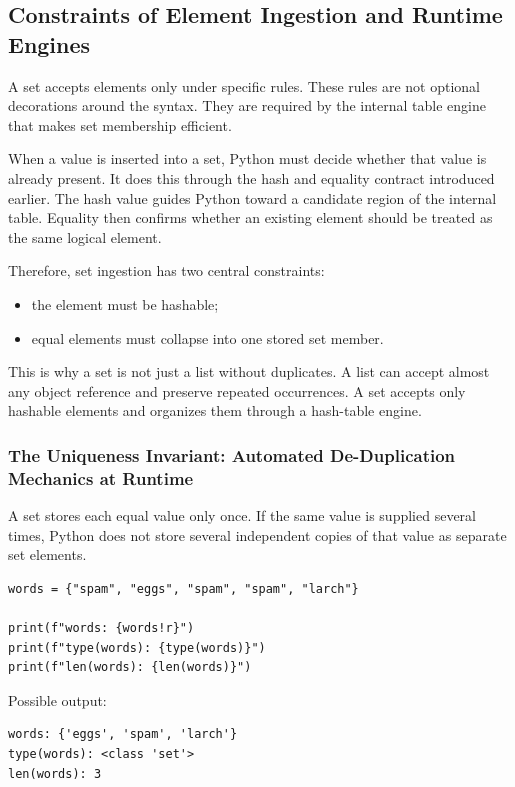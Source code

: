 \subsection{Constraints of Element Ingestion and Runtime Engines}

A set accepts elements only under specific rules. These rules are not optional decorations around the syntax. They are required by the internal table engine that makes set membership efficient.

When a value is inserted into a set, Python must decide whether that value is already present. It does this through the hash and equality contract introduced earlier. The hash value guides Python toward a candidate region of the internal table. Equality then confirms whether an existing element should be treated as the same logical element.

Therefore, set ingestion has two central constraints:

\begin{itemize}
    \item the element must be hashable;
    \item equal elements must collapse into one stored set member.
\end{itemize}

This is why a set is not just a list without duplicates. A list can accept almost any object reference and preserve repeated occurrences. A set accepts only hashable elements and organizes them through a hash-table engine.

\subsubsection{The Uniqueness Invariant: Automated De-Duplication Mechanics at Runtime}

A set stores each equal value only once. If the same value is supplied several times, Python does not store several independent copies of that value as separate set elements.

\begin{verbatim}
words = {"spam", "eggs", "spam", "spam", "larch"}

print(f"words: {words!r}")
print(f"type(words): {type(words)}")
print(f"len(words): {len(words)}")
\end{verbatim}

Possible output:

\begin{verbatim}
words: {'eggs', 'spam', 'larch'}
type(words): <class 'set'>
len(words): 3
\end{verbatim}

